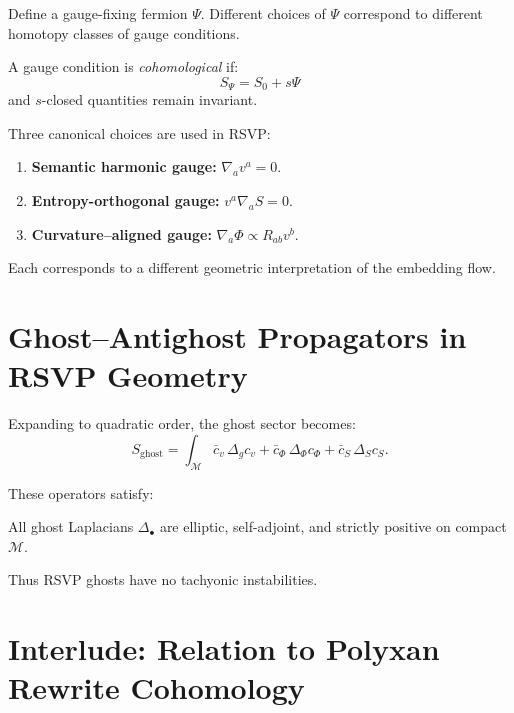 Define a gauge-fixing fermion $\Psi$.
Different choices of $\Psi$ correspond to different homotopy classes of gauge
conditions.

\begin{definition}
A gauge condition is \emph{cohomological} if:
\[
S_\Psi = S_0 + s\Psi
\]
and $s$-closed quantities remain invariant.
\end{definition}

Three canonical choices are used in RSVP:

\begin{enumerate}
\item \textbf{Semantic harmonic gauge:}
      $\nabla_a v^a = 0$.

\item \textbf{Entropy-orthogonal gauge:}
      $v^a \nabla_a S = 0$.

\item \textbf{Curvature–aligned gauge:}
      $\nabla_a \Phi \propto R_{ab} v^b$.
\end{enumerate}

Each corresponds to a different geometric interpretation of the embedding flow.

\section{Ghost–Antighost Propagators in RSVP Geometry}

Expanding to quadratic order, the ghost sector becomes:
\[
S_{\mathrm{ghost}}
  = \int_\mathcal{M}
      \bar{c}_v\, \Delta_g c_v
    + \bar{c}_\Phi\, \Delta_\Phi c_\Phi
    + \bar{c}_S\, \Delta_S c_S.
\]

These operators satisfy:

\begin{proposition}
All ghost Laplacians $\Delta_\bullet$ are elliptic, self-adjoint, and strictly
positive on compact $\mathcal{M}$.
\end{proposition}

Thus RSVP ghosts have no tachyonic instabilities.

\section{Interlude: Relation to Polyxan Rewrite Cohomology}

